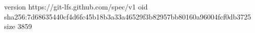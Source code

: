 version https://git-lfs.github.com/spec/v1
oid sha256:7d68635440cf4d6fc45b18b3a33a46529f3b82957bb80160a96004fcf0db3725
size 3859
